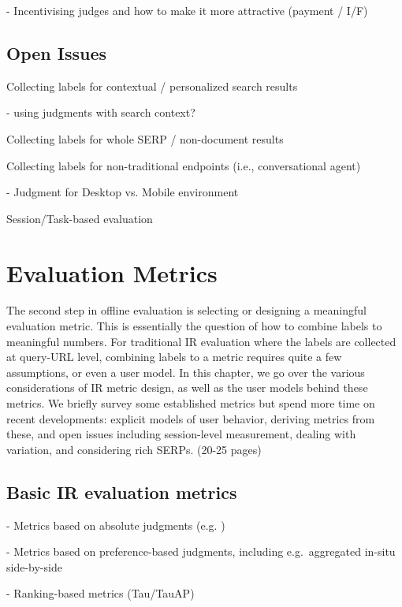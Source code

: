 \documentclass[openany]{now} %
\newcommand{\newpar}{\bigskip\noindent}
\begin{document}
- Incentivising judges and how to make it more attractive (payment / I/F)
\cite{Megorskaya2015} \cite{Davtyan2015}  \cite{Rokicki:2014}  \cite{Eickhoff:2012}

\section{Open Issues}

Collecting labels for contextual / personalized search results

- using judgments with search context?

\newpar
Collecting labels for whole SERP / non-document results

\newpar
Collecting labels for non-traditional endpoints (i.e., conversational agent)

- Judgment for Desktop vs. Mobile environment \cite{Verma:2016:CRMD}

\newpar
Session/Task-based evaluation \cite{Moraveji:2011} \cite{Xu:2009}


\chapter{Evaluation Metrics}
\label{c-metrics}

The second step in offline evaluation is selecting or designing a meaningful evaluation metric. This is essentially the question of how to combine labels to meaningful numbers. For traditional IR evaluation where the labels are collected at query-URL level, combining labels to a metric requires quite a few assumptions, or even a user model. In this chapter, we go over the various considerations of IR metric design, as well as the user models behind these metrics. We briefly survey some established metrics but spend more time on recent developments: explicit models of user behavior, deriving metrics from these, and open issues including session-level measurement, dealing with variation, and considering rich SERPs. (20-25 pages)

\section{Basic IR evaluation metrics}

- Metrics based on absolute judgments (e.g. \cite{cooper73selecting})

- Metrics based on preference-based judgments, including e.g.\ aggregated in-situ side-by-side \cite{Thomas2006}

- Ranking-based metrics (Tau/TauAP)
\end{document}
